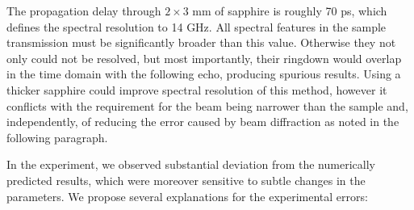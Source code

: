 The propagation delay through $2\times 3$ mm of sapphire is roughly 70 ps, which defines the spectral resolution to 14 GHz. All spectral features in the sample transmission must be significantly broader than this value. Otherwise they not only could not be resolved, but most importantly, their ringdown would overlap in the time domain with the following echo, producing spurious results. Using a thicker sapphire could improve spectral resolution of this method, however it conflicts with the requirement for the beam being narrower than the sample \cite{nemec2009tunable} and, independently, of reducing the error caused by beam diffraction as noted in the following paragraph.

In the experiment, we observed substantial deviation  %
from the numerically predicted results, which were moreover sensitive to subtle changes in the parameters. We propose  several explanations for the experimental errors:
